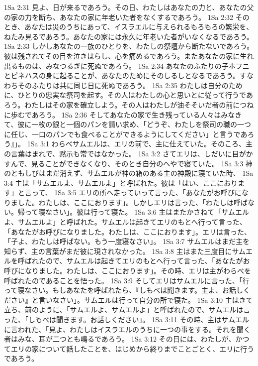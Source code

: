 1Sa 2:31  見よ、日が来るであろう。その日、わたしはあなたの力と、あなたの父の家の力を断ち、あなたの家に年老いた者をなくするであろう。
1Sa 2:32  そのとき、あなたは災のうちにあって、イスラエルに与えられるもろもろの繁栄を、ねたみ見るであろう。あなたの家には永久に年老いた者がいなくなるであろう。
1Sa 2:33  しかしあなたの一族のひとりを、わたしの祭壇から断たないであろう。彼は残されてその目を泣きはらし、心を痛めるであろう。またあなたの家に生れ出るものは、みなつるぎに死ぬであろう。
1Sa 2:34  あなたのふたりの子ホフニとピネハスの身に起ることが、あなたのためにそのしるしとなるであろう。すなわちそのふたりは共に同じ日に死ぬであろう。
1Sa 2:35  わたしは自分のために、ひとりの忠実な祭司を起す。その人はわたしの心と思いとに従って行うであろう。わたしはその家を確立しよう。その人はわたしが油そそいだ者の前につねに歩むであろう。
1Sa 2:36  そしてあなたの家で生き残っている人々はみなきて、彼に一枚の銀と一個のパンを請い求め、「どうぞ、わたしを祭司の職の一つに任じ、一口のパンでも食べることができるようにしてください」と言うであろう』」。
1Sa 3:1  わらべサムエルは、エリの前で、主に仕えていた。そのころ、主の言葉はまれで、黙示も常ではなかった。
1Sa 3:2  さてエリは、しだいに目がかすんで、見ることができなくなり、そのとき自分のへやで寝ていた。
1Sa 3:3  神のともしびはまだ消えず、サムエルが神の箱のある主の神殿に寝ていた時、
1Sa 3:4  主は「サムエルよ、サムエルよ」と呼ばれた。彼は「はい、ここにおります」と言って、
1Sa 3:5  エリの所へ走っていって言った、「あなたがお呼びになりました。わたしは、ここにおります」。しかしエリは言った、「わたしは呼ばない。帰って寝なさい」。彼は行って寝た。
1Sa 3:6  主はまたかさねて「サムエルよ、サムエルよ」と呼ばれた。サムエルは起きてエリのもとへ行って言った、「あなたがお呼びになりました。わたしは、ここにおります」。エリは言った、「子よ、わたしは呼ばない。もう一度寝なさい」。
1Sa 3:7  サムエルはまだ主を知らず、主の言葉がまだ彼に現されなかった。
1Sa 3:8  主はまた三度目にサムエルを呼ばれたので、サムエルは起きてエリのもとへ行って言った、「あなたがお呼びになりました。わたしは、ここにおります」。その時、エリは主がわらべを呼ばれたのであることを悟った。
1Sa 3:9  そしてエリはサムエルに言った、「行って寝なさい。もしあなたを呼ばれたら、『しもべは聞きます。主よ、お話しください』と言いなさい」。サムエルは行って自分の所で寝た。
1Sa 3:10  主はきて立ち、前のように、「サムエルよ、サムエルよ」と呼ばれたので、サムエルは言った、「しもべは聞きます。お話しください」。
1Sa 3:11  その時、主はサムエルに言われた、「見よ、わたしはイスラエルのうちに一つの事をする。それを聞く者はみな、耳が二つとも鳴るであろう。
1Sa 3:12  その日には、わたしが、かつてエリの家について話したことを、はじめから終りまでことごとく、エリに行うであろう。
